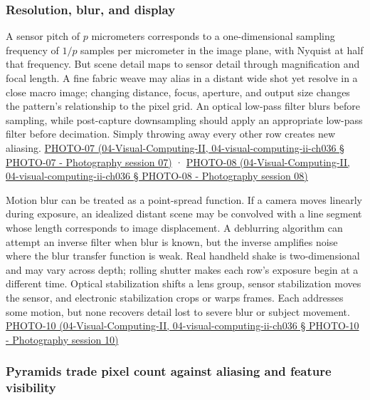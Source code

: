 \subsubsection{Resolution, blur, and display}\label{resolution-blur-and-display}

A sensor pitch of \(p\) micrometers corresponds to a one-dimensional sampling frequency of \(1/p\) samples per micrometer in the image plane, with Nyquist at half that frequency. But scene detail maps to sensor detail through magnification and focal length. A fine fabric weave may alias in a distant wide shot yet resolve in a close macro image; changing distance, focus, aperture, and output size changes the pattern's relationship to the pixel grid. An optical low-pass filter blurs before sampling, while post-capture downsampling should apply an appropriate low-pass filter before decimation. Simply throwing away every other row creates new aliasing. \href{}{PHOTO-07 (04-Visual-Computing-II, 04-visual-computing-ii-ch036 § PHOTO-07 - Photography session 07)} · \href{}{PHOTO-08 (04-Visual-Computing-II, 04-visual-computing-ii-ch036 § PHOTO-08 - Photography session 08)}

Motion blur can be treated as a point-spread function. If a camera moves linearly during exposure, an idealized distant scene may be convolved with a line segment whose length corresponds to image displacement. A deblurring algorithm can attempt an inverse filter when blur is known, but the inverse amplifies noise where the blur transfer function is weak. Real handheld shake is two-dimensional and may vary across depth; rolling shutter makes each row's exposure begin at a different time. Optical stabilization shifts a lens group, sensor stabilization moves the sensor, and electronic stabilization crops or warps frames. Each addresses some motion, but none recovers detail lost to severe blur or subject movement. \href{}{PHOTO-10 (04-Visual-Computing-II, 04-visual-computing-ii-ch036 § PHOTO-10 - Photography session 10)}

\subsubsection{Pyramids trade pixel count against aliasing and feature visibility}\label{pyramids-trade-pixel-count-against-aliasing-and-feature-visibility}

